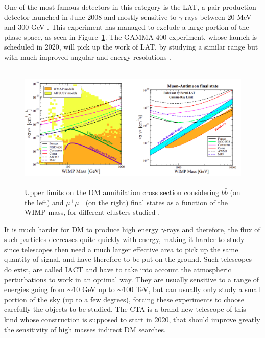 \documentclass[a4paper, 10pt, openright]{report}
\begin{document}
One of the most famous detectors in this category is the \ac{LAT}, a pair production detector launched in June 2008 and mostly sensitive to $\gamma$-rays between 20 MeV and 300 GeV \cite{LATExperiment}. This experiment has managed to exclude a large portion of the phase space, as seen in Figure~\ref{figure:LATExclusion}. The GAMMA-400 experiment, whose launch is scheduled in 2020, will pick up the work of \ac{LAT}, by studying a similar range but with much improved angular and energy resolutions \cite{GAMMA400}. 

\begin{figure}[htbp]
\begin{center}
\includegraphics[width=12cm, height=6cm]{figs/LATExclusion.png}
\caption{Upper limits on the \ac{DM} annihilation cross section considering $b \bar b$ (on the left) and $\mu^+ \mu^-$ (on the right) final states as a function of the \ac{WIMP} mass, for different clusters studied \cite{LATExperiment}.}
\label{figure:LATExclusion}
\end{center}
\end{figure}

It is much harder for \ac{DM} to produce high energy $\gamma$-rays and therefore, the flux of such particles decreases quite quickly with energy, making it harder to study since telescopes then need a much larger effective area to pick up the same quantity of signal, and have therefore to be put on the ground. Such telescopes do exist, are called \ac{IACT} and have to take into account the atmospheric perturbations to work in an optimal way. They are usually sensitive to a range of energies going from $\sim 10$ GeV up to $\sim 100$ TeV, but can usually only study a small portion of the sky (up to a few degrees), forcing these experiments to choose carefully the objects to be studied. The \ac{CTA} is a brand new telescope of this kind whose construction is supposed to start in 2020, that should improve greatly the sensitivity of high masses indirect \ac{DM} searches.
\end{document}
